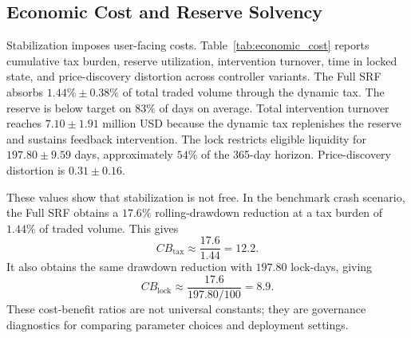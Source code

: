 \documentclass[a4paper,fleqn]{cas-dc}
\begin{document}
\subsection{Economic Cost and Reserve Solvency}
\label{sec:exp-cost}

Stabilization imposes user-facing costs. Table~\ref{tab:economic_cost} reports cumulative tax burden, reserve utilization, intervention turnover, time in locked state, and price-discovery distortion across controller variants. The Full SRF absorbs \(1.44\%\pm0.38\%\) of total traded volume through the dynamic tax. The reserve is below target on \(83\%\) of days on average. Total intervention turnover reaches \(7.10\pm1.91\) million USD because the dynamic tax replenishes the reserve and sustains feedback intervention. The lock restricts eligible liquidity for \(197.80\pm9.59\) days, approximately \(54\%\) of the 365-day horizon. Price-discovery distortion is \(0.31\pm0.16\).

These values show that stabilization is not free. In the benchmark crash scenario, the Full SRF obtains a \(17.6\%\) rolling-drawdown reduction at a tax burden of \(1.44\%\) of traded volume. This gives
\[
CB_{\mathrm{tax}}
\approx
\frac{17.6}{1.44}
=
12.2.
\]
It also obtains the same drawdown reduction with \(197.80\) lock-days, giving
\[
CB_{\mathrm{lock}}
\approx
\frac{17.6}{197.80/100}
=
8.9.
\]
These cost-benefit ratios are not universal constants; they are governance diagnostics for comparing parameter choices and deployment settings.
\end{document}
